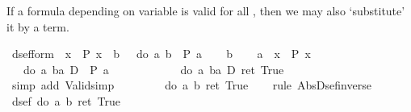 \begin{isabellebody}
%
\begin{isamarkuptext}%
If a formula depending on variable  is valid for all , then we
  may also `substitute' it by a  term.%
\end{isamarkuptext}%
\isamarkuptrue%
\ dsef{\isacharunderscore}form{\isacharcolon}\ {\isachardoublequote}\ {\isasymforall}x{\isachardot}\ {\isasymturnstile}\ P\ x\ {\isasymLongrightarrow}\ {\isasymforall}b{\isachardot}\ {\isasymturnstile}\ {\isasymUp}\ {\isacharparenleft}do\ {\isacharbraceleft}a{\isasymleftarrow}{\isasymDown}\ b{\isacharsemicolon}\ {\isasymDown}\ {\isacharparenleft}P\ a{\isacharparenright}{\isacharbraceright}{\isacharparenright}{\isachardoublequote}\isanewline
\isamarkupfalse%
\isanewline
\ \ \isamarkupfalse%
\ b\isanewline
\ \ \isamarkupfalse%
\ a{}{\isacharcolon}\ {\isachardoublequote}\ {\isasymforall}x{\isachardot}\ {\isasymturnstile}\ P\ x{\isachardoublequote}\isanewline
\ \ \isamarkupfalse%
\ {\isachardoublequote}{\isasymDown}\ {\isacharparenleft}{\isasymUp}\ {\isacharparenleft}do\ {\isacharbraceleft}a{\isasymleftarrow}{\isasymDown}\ {\isacharparenleft}b{\isacharcolon}{\isacharcolon}{\isacharprime}a\ D{\isacharparenright}{\isacharsemicolon}\ {\isasymDown}\ {\isacharparenleft}P\ a{\isacharparenright}{\isacharbraceright}{\isacharparenright}{\isacharparenright}\ {\isacharequal}\ \isanewline
\ \ \ \ \ \ \ \ {\isasymDown}\ {\isacharparenleft}{\isasymUp}\ {\isacharparenleft}do\ {\isacharbraceleft}a{\isasymleftarrow}{\isasymDown}\ {\isacharparenleft}b{\isacharcolon}{\isacharcolon}{\isacharprime}a\ D{\isacharparenright}{\isacharsemicolon}\ ret\ True{\isacharbraceright}{\isacharparenright}{\isacharparenright}{\isachardoublequote}\isanewline
\ \ \ \ \isamarkupfalse%
\ {\isacharparenleft}simp\ add{\isacharcolon}\ Valid{\isacharunderscore}simp{\isacharparenright}\ \isanewline
\ \ \isamarkupfalse%
\ \isamarkupfalse%
\ {\isachardoublequote}{\isasymdots}\ {\isacharequal}\ do\ {\isacharbraceleft}a{\isasymleftarrow}{\isasymDown}\ b{\isacharsemicolon}\ ret\ True{\isacharbraceright}{\isachardoublequote}\isanewline
\ \ \isamarkupfalse%
\ {\isacharparenleft}rule\ Abs{\isacharunderscore}Dsef{\isacharunderscore}inverse{\isacharparenright}\isanewline
\ \ \ \ \isamarkupfalse%
\ {\isachardoublequote}dsef\ {\isacharparenleft}do\ {\isacharbraceleft}a{\isasymleftarrow}{\isasymDown}\ b{\isacharsemicolon}\ ret\ True{\isacharbraceright}{\isacharparenright}{\isachardoublequote}\isanewline

\end{isabellebody}
